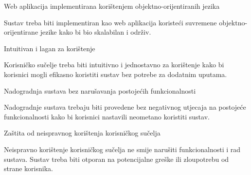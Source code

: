 \begin{packed_enum}
\begin{packed_item}
	\end{packed_item}
	\large \item Web aplikacija implementirana korištenjem objektno-orijentiranih jezika \normalsize
	\begin{packed_item}
		\item Sustav treba biti implementiran kao web aplikacija koristeći suvremene objektno-orijentirane jezike kako bi bio skalabilan i održiv.
	\end{packed_item}
	\large \item Intuitivan i lagan za korištenje \normalsize
	\begin{packed_item}
		\item Korisničko sučelje treba biti intuitivno i jednostavno za korištenje kako bi korisnici mogli efikasno koristiti sustav bez potrebe za dodatnim uputama.
	\end{packed_item}
	\large \item Nadogradnja sustava bez narušavanja postojećih funkcionalnosti \normalsize
	\begin{packed_item}
		\item Nadogradnje sustava trebaju biti provedene bez negativnog utjecaja na postojeće funkcionalnosti kako bi korisnici nastavili neometano koristiti sustav.
	\end{packed_item}
	\large \item Zaštita od neispravnog korištenja korisničkog sučelja \normalsize
	\begin{packed_item}
		\item Neispravno korištenje korisničkog sučelja ne smije narušiti funkcionalnosti i rad sustava. Sustav treba biti otporan na potencijalne greške ili zloupotrebu od strane korisnika.
	\end{packed_item}
	
	
\end{packed_enum}